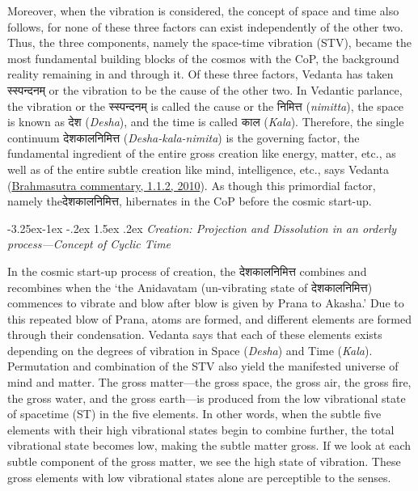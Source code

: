\documentclass[twoside, 13pt]{article}
\makeatletter
\renewcommand\subsection{\@startsection{subsection}{2}{\z@}%
                                     {-3.25ex\@plus -1ex \@minus -.2ex}%
                                     {1.5ex \@plus .2ex}%
                                     {\normalfont\Large\bfseries}}
\makeatother
\begin{document}
{{Moreover, when the vibration is considered, the concept of space and time also follows, for none of these three factors can exist independently of the other two. Thus, the three components, namely the space-time vibration (STV), became the most fundamental building blocks of the cosmos with the CoP, the background reality remaining in and through it. Of these three factors, Vedanta has taken \foreignlanguage{hindi}{{\fontsize{9}{11}\selectfont स्स्पन्दनम्}} or the vibration to be the cause of the other two. In Vedantic parlance, the vibration or the \foreignlanguage{hindi}{{\fontsize{9}{11}\selectfont स्स्पन्दनम् }}is called the cause or the \foreignlanguage{hindi}{{\fontsize{9}{11}\selectfont निमित्त}} (\textit{nimitta}), the space is known as \foreignlanguage{hindi}{{\fontsize{9}{11}\selectfont देश }}(\textit{Desha}), and the time is called \foreignlanguage{hindi}{{\fontsize{9}{11}\selectfont काल}} (\textit{Kala}). Therefore, the single continuum \foreignlanguage{hindi}{{\fontsize{9}{11}\selectfont देशकालनिमित्त}} (\textit{Desha-kala-nimita}) is the governing factor, the fundamental ingredient of the entire gross creation like energy, matter, etc., as well as of the entire subtle creation like mind, intelligence, etc., says Vedanta (\underline{Brahmasutra commentary, 1.1.2, 2010}). As though this primordial factor, namely the\break \foreignlanguage{hindi}{{\fontsize{9}{11}\selectfont देशकालनिमित्त,}} hibernates in the CoP before the cosmic start-up.} 

{\fontsize{8}{10}\selectfont\subsection{\textit{Creation: Projection and Dissolution in an orderly\\ process—Concept of Cyclic Time}}}\label{subsec-2.2}


{\fontsize{12}{14}\selectfont In the cosmic start-up process of creation, the \foreignlanguage{hindi}{{\fontsize{9}{11}\selectfont देशकालनिमित्त}} combines and recombines when the ‘the Anidavatam (un-vibrating state of \foreignlanguage{hindi}{{\fontsize{9}{11}\selectfont देशकालनिमित्त}}) commences to vibrate and blow after blow is given by Prana to Akasha.’ Due to this repeated blow of Prana, atoms are formed, and different elements are formed through their condensation. Vedanta says that each of these elements exists depending on the degrees of vibration in Space (\textit{Desha}) and Time (\textit{Kala}). Permutation and combination of the STV also yield the manifested universe of mind and matter. The gross matter—the gross space, the gross air, the gross fire, the gross water, and the gross earth—is produced from the low vibrational state of  spacetime (ST) in the five elements. In other words, when the subtle five elements with their high vibrational states begin to combine further, the total vibrational state becomes low, making the subtle matter gross. If we look at each subtle component of the gross matter, we see the high state of vibration. These gross elements with low vibrational states alone are perceptible to the senses. 


}}
\end{document}
